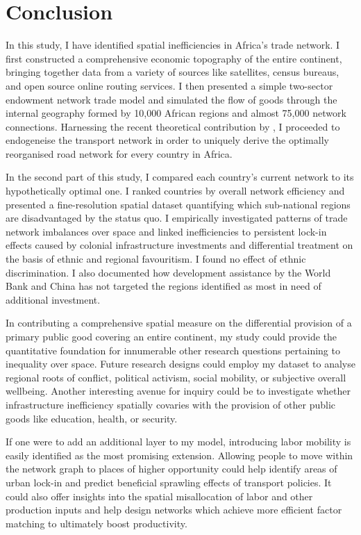 \documentclass[11pt, oneside]{article}   	%
\begin{document}
\section{Conclusion}
\label{chap:conclusion}

In this study, I have identified spatial inefficiencies in Africa's trade network. I first constructed a comprehensive economic topography of the entire continent, bringing together data from a variety of sources like satellites, census bureaus, and open source online routing services. I then presented a simple two-sector endowment network trade model and simulated the flow of goods through the internal geography formed by 10,000 African regions and almost 75,000 network connections. Harnessing the recent theoretical contribution by \cite{fajgelbaum_optimal_2017}, I proceeded to endogeneise the transport network in order to uniquely derive the optimally reorganised road network for every country in Africa.

In the second part of this study, I compared each country's current network to its hypothetically optimal one. I ranked countries by overall network efficiency and presented a fine-resolution spatial dataset quantifying which sub-national regions are disadvantaged by the status quo. I empirically investigated patterns of trade network imbalances over space and linked inefficiencies to persistent lock-in effects caused by colonial infrastructure investments and differential treatment on the basis of ethnic and regional favouritism. I found no effect of ethnic discrimination. I also documented how development assistance by the World Bank and China has not targeted the regions identified as most in need of additional investment.

In contributing a comprehensive spatial measure on the differential provision of a primary public good covering an entire continent, my study could provide the quantitative foundation for innumerable other research questions pertaining to inequality over space. Future research designs could employ my dataset to analyse regional roots of conflict, political activism, social mobility, or subjective overall wellbeing. Another interesting avenue for inquiry could be to investigate whether infrastructure inefficiency spatially covaries with the provision of other public goods like education, health, or security.

If one were to add an additional layer to my model, introducing labor mobility is easily identified as the most promising extension. Allowing people to move within the network graph to places of higher opportunity could help identify areas of urban lock-in and predict beneficial sprawling effects of transport policies. It could also offer insights into the spatial misallocation of labor and other production inputs and help design networks which achieve more efficient factor matching to ultimately boost productivity.
\end{document}
